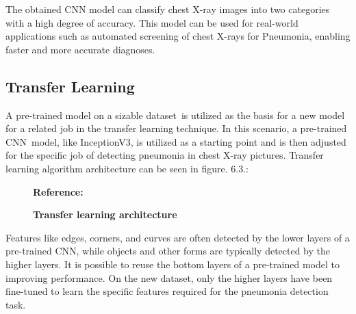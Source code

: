  
 The obtained CNN model  can classify chest X-ray images into two categories with a high degree of accuracy. This model can be used for real-world applications such as automated screening of chest X-rays for Pneumonia, enabling faster and more accurate diagnoses.
 \cite{Kermany:2018}
 
  
 \subsection{Transfer Learning}
 
 A pre-trained model on a sizable dataset is utilized as the basis for a new model for a related job in the transfer learning technique. In this scenario, a pre-trained CNN model, like InceptionV3, is utilized as a starting point and is then adjusted for the specific job of detecting pneumonia in chest X-ray pictures.\cite{Rajpurkar:2017} Transfer learning algorithm architecture can be seen in figure. 6.3.:\\
 \bigskip 
 
 \begin{figure}
 	\centering
 	\caption{\textbf{Transfer learning architecture}}
 	\footnotesize \textbf{Reference:}\cite{Firdiantika:2022}
 		\label{fig:Transfer learning architecture}
 	\end{figure}
 	
 	Features like edges, corners, and curves are often detected by the lower layers of a pre-trained CNN, while objects and other forms are typically detected by the higher layers. It is possible to reuse the bottom layers of a pre-trained model to improving performance. On the new dataset, only the higher layers have been fine-tuned to learn the specific features required for the pneumonia detection task. \cite{ Rajpurkar:2018}
 	\bigskip   
 	
 	
 	
 	
 	

 
 

